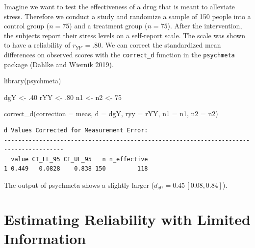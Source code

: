 \documentclass[
  letterpaper,
  DIV=11,
  numbers=noendperiod]{scrreprt}
\newenvironment{Shaded}{}{}
\newcommand{\AttributeTok}[1]{\textcolor[rgb]{0.00,0.34,0.68}{#1}}
\newcommand{\DecValTok}[1]{\textcolor[rgb]{0.69,0.50,0.00}{#1}}
\newcommand{\FunctionTok}[1]{\textcolor[rgb]{0.39,0.29,0.61}{#1}}
\newcommand{\NormalTok}[1]{\textcolor[rgb]{0.12,0.11,0.11}{#1}}
\newcommand{\OtherTok}[1]{\textcolor[rgb]{0.00,0.43,0.16}{#1}}
\newcommand{\StringTok}[1]{\textcolor[rgb]{0.75,0.01,0.01}{#1}}
\begin{document}
\begin{tcolorbox}[enhanced jigsaw, toptitle=1mm, titlerule=0mm, arc=.35mm, breakable, colframe=quarto-callout-note-color-frame, title={Applied Example in R}, opacitybacktitle=0.6, opacityback=0, colbacktitle=quarto-callout-note-color!10!white, coltitle=black, bottomtitle=1mm, colback=white, bottomrule=.15mm, rightrule=.15mm, toprule=.15mm, leftrule=.75mm, left=2mm]

Imagine we want to test the effectiveness of a drug that is meant to
alleviate stress. Therefore we conduct a study and randomize a sample of
150 people into a control group (\(n=75\)) and a treatment group
(\(n=75\)). After the intervention, the subjects report their stress
levels on a self-report scale. The scale was shown to have a reliability
of \(r_{YY'}=.80\). We can correct the standardized mean differences on
observed scores with the \texttt{correct\_d} function in the
\texttt{psychmeta} package (Dahlke and Wiernik 2019).

\begin{Shaded}
\begin{Highlighting}[]
\FunctionTok{library}\NormalTok{(psychmeta)}

\NormalTok{dgY }\OtherTok{\textless{}{-}}\NormalTok{ .}\DecValTok{40}
\NormalTok{rYY }\OtherTok{\textless{}{-}}\NormalTok{ .}\DecValTok{80}
\NormalTok{n1 }\OtherTok{\textless{}{-}}\NormalTok{ n2 }\OtherTok{\textless{}{-}} \DecValTok{75}

\FunctionTok{correct\_d}\NormalTok{(}\AttributeTok{correction =} \StringTok{\textquotesingle{}meas\textquotesingle{}}\NormalTok{,}
          \AttributeTok{d =}\NormalTok{ dgY,}
          \AttributeTok{ryy =}\NormalTok{ rYY,}
          \AttributeTok{n1 =}\NormalTok{ n1,}
          \AttributeTok{n2 =}\NormalTok{ n2)}
\end{Highlighting}
\end{Shaded}

\begin{verbatim}
d Values Corrected for Measurement Error:
---------------------------------------------------------------------------------------
  value CI_LL_95 CI_UL_95   n n_effective
1 0.449   0.0828    0.838 150         118
\end{verbatim}

The output of psychmeta shows a slightly larger
(\(d_{gU} = 0.45\,[0.08,0.84]\)).

\end{tcolorbox}

\hypertarget{sec-lim-information}{%
\section{Estimating Reliability with Limited
Information}\label{sec-lim-information}}
\end{document}
